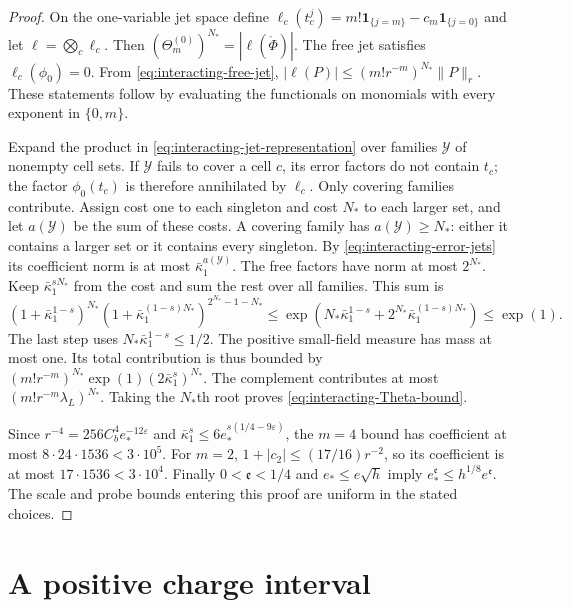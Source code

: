 \begin{proof}
On the one-variable jet space define
$\ell_c(t_c^j)=m!\mathbf1_{\{j=m\}}-c_m\mathbf1_{\{j=0\}}$
and let $\ell=\bigotimes_c\ell_c$.
Then $(\Theta_m^{(0)})^{N_*}=|\ell(\mathring\Phi)|$.
The free jet satisfies $\ell_c(\phi_0)=0$.
From \eqref{eq:interacting-free-jet},
$|\ell(P)|\le(m!r^{-m})^{N_*}\|P\|_r$.
These statements follow by evaluating the
functionals on monomials with every exponent
in $\{0,m\}$.

Expand the product in
\eqref{eq:interacting-jet-representation} over
families $\mathcal Y$ of nonempty cell sets.
If $\mathcal Y$ fails to cover a cell $c$,
its error factors do not contain $t_c$;
the factor $\phi_0(t_c)$ is therefore
annihilated by $\ell_c$. Only covering
families contribute.
Assign cost one to each singleton and
cost $N_*$ to each larger set, and let
$a(\mathcal Y)$ be the sum of these costs.
A covering family has $a(\mathcal Y)\ge N_*$:
either it contains a larger set or it
contains every singleton.
By \eqref{eq:interacting-error-jets} its
coefficient norm is at most
$\bar\kappa_1^{a(\mathcal Y)}$.
The free factors have norm at most $2^{N_*}$.
Keep $\bar\kappa_1^{sN_*}$ from the cost
and sum the rest over all families. This
sum is
\[
 (1+\bar\kappa_1^{1-s})^{N_*}
  (1+\bar\kappa_1^{(1-s)N_*})^{2^{N_*}-1-N_*}
 \le\exp\left(N_*\bar\kappa_1^{1-s}
                  +2^{N_*}\bar\kappa_1^{(1-s)N_*}\right)
 \le\exp(1).
\]
The last step uses $N_*\bar\kappa_1^{1-s}\le1/2$.
The positive small-field measure has mass at
most one. Its total contribution is thus
bounded by
$(m!r^{-m})^{N_*}\exp(1)(2\bar\kappa_1^s)^{N_*}$.
The complement contributes at most
$(m!r^{-m}\lambda_L)^{N_*}$.
Taking the $N_*$th root proves
\eqref{eq:interacting-Theta-bound}.

Since $r^{-4}=256C_b^4e_*^{-12\varepsilon}$
and $\bar\kappa_1^s\le6e_*^{s(1/4-9\varepsilon)}$,
the $m=4$ bound has coefficient at most
$8\cdot24\cdot1536<3\cdot10^5$.
For $m=2$, $1+|c_2|\le(17/16)r^{-2}$,
so its coefficient is at most
$17\cdot1536<3\cdot10^4$.
Finally $0<\mathfrak e<1/4$ and
$e_*\le e\sqrt h$ imply
$e_*^{\mathfrak e}\le h^{1/8}e^{\mathfrak e}$.
The scale and probe bounds entering this
proof are uniform in the stated choices.
\end{proof}

\section{A positive charge interval}
\label{subsec:interacting-positive-threshold}


